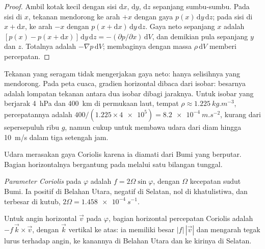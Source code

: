 \begin{proof}
Ambil kotak kecil dengan sisi $\mathrm dx$, $\mathrm dy$, $\mathrm dz$ sepanjang sumbu-sumbu.
Pada sisi di $x$, tekanan mendorong ke arah $+x$ dengan gaya
$p(x)\,\mathrm dy\,\mathrm dz$; pada sisi di $x + \mathrm dx$, ke arah $-x$ dengan
$p(x + \mathrm dx)\,\mathrm dy\,\mathrm dz$. Gaya neto sepanjang
$x$ adalah $[p(x) - p(x + \mathrm dx)]\,\mathrm dy\,\mathrm dz = -(\partial p/\partial
x)\,\mathrm dV$, dan demikian pula sepanjang $y$ dan $z$. Totalnya adalah $-\nabla p\,
\mathrm dV$; membaginya dengan massa $\rho\,\mathrm dV$ memberi percepatan.
\end{proof}

Tekanan yang seragam tidak mengerjakan gaya neto: hanya selisihnya yang mendorong. Pada peta cuaca, gradien horizontal dibaca dari isobar: besarnya adalah lompatan tekanan antara dua isobar dibagi jaraknya. Untuk isobar yang berjarak \qty{4}{hPa} dan \qty{400}{km} di permukaan laut, tempat $\rho \approx \qty{1.225}{kg.m^{-3}}$, percepatannya adalah $400/(1.225 \times \num{4e5}) = \qty{8.2e-4}{m.s^{-2}}$, kurang dari sepersepuluh ribu $g$, namun cukup untuk membawa udara dari diam hingga \qty{10}{m/s} dalam tiga setengah jam.

Udara merasakan gaya Coriolis karena ia diamati dari Bumi yang berputar. Bagian horizontalnya bergantung pada  melalui satu bilangan tunggal.

\begin{definition}\label{def:b1:atmospheric-circulation:coriolis-parameter}
\emph{Parameter Coriolis} pada  $\varphi$ adalah $f = 2\Omega\sin\varphi$, dengan $\Omega$ kecepatan sudut Bumi. Ia positif di Belahan Utara, negatif di Selatan, nol di khatulistiwa, dan terbesar di kutub, $2\Omega = \qty{1.458e-4}{s^{-1}}$.
\end{definition}

\begin{proposition}\label{prop:b1:atmospheric-circulation:coriolis}
Untuk angin horizontal $\vec v$ pada  $\varphi$, bagian horizontal percepatan Coriolis adalah $-f\,\vec k\times\vec v$, dengan $\vec k$ vertikal ke atas: ia memiliki besar $|f|\,|\vec v|$ dan mengarah tegak lurus terhadap angin, ke kanannya di Belahan Utara dan ke kirinya di Selatan.
\end{proposition}

